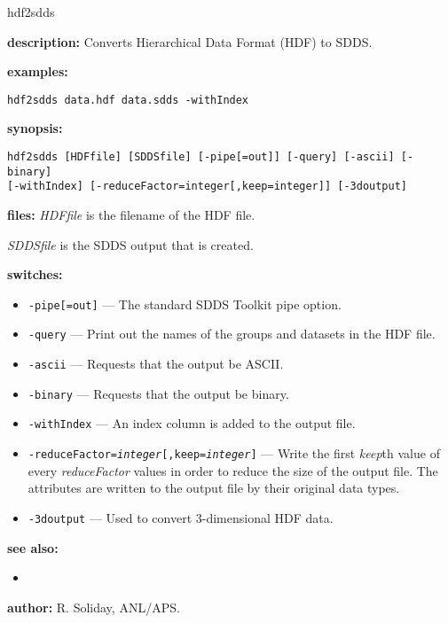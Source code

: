 \begin{sddsprog}{hdf2sdds}
\item \textbf{description:} Converts Hierarchical Data Format (HDF) to SDDS.
\item \textbf{examples:}
\begin{verbatim}
hdf2sdds data.hdf data.sdds -withIndex
\end{verbatim}
\item \textbf{synopsis:}
\begin{verbatim}
hdf2sdds [HDFfile] [SDDSfile] [-pipe[=out]] [-query] [-ascii] [-binary]
[-withIndex] [-reduceFactor=integer[,keep=integer]] [-3doutput]
\end{verbatim}
\item \textbf{files:}
{\em HDFfile} is the filename of the HDF file.

{\em SDDSfile} is the SDDS output that is created.
\item \textbf{switches:}
\begin{itemize}
  \item \verb|-pipe[=out]| --- The standard SDDS Toolkit pipe option.
  \item \verb|-query| --- Print out the names of the groups and datasets in the HDF file.
  \item \verb|-ascii| --- Requests that the output be ASCII.
  \item \verb|-binary| --- Requests that the output be binary.
  \item \verb|-withIndex| --- An index column is added to the output file.
  \item {\tt -reduceFactor={\em integer}[,keep={\em integer}]} --- Write the first {\em keep}th value of every {\em reduceFactor} values in order to reduce the size of the output file. The attributes are written to the output file by their original data types.
  \item \verb|-3doutput| --- Used to convert 3-dimensional HDF data.
\end{itemize}
\item \textbf{see also:}
\begin{itemize}
  \item {}
\end{itemize}
\item \textbf{author:} R. Soliday, ANL/APS.
\end{sddsprog}

